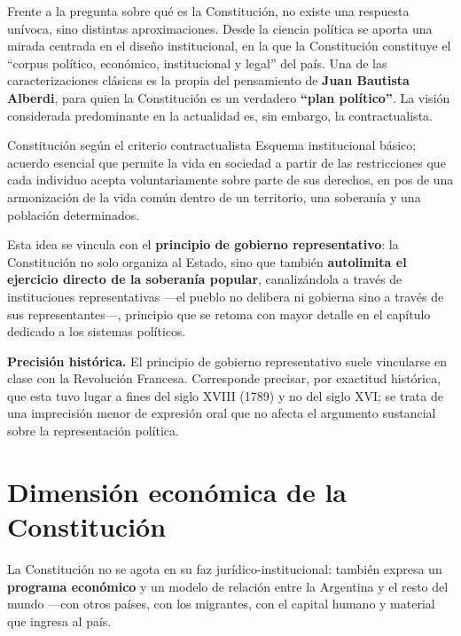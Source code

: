 \documentclass[12pt,oneside]{book}
\begin{document}
Frente a la pregunta sobre qué es la Constitución, no existe una respuesta unívoca, sino distintas aproximaciones. Desde la ciencia política se aporta una mirada centrada en el diseño institucional, en la que la Constitución constituye el ``corpus político, económico, institucional y legal'' del país. Una de las caracterizaciones clásicas es la propia del pensamiento de \textbf{Juan Bautista Alberdi}, para quien la Constitución es un verdadero \textbf{``plan político''}. La visión considerada predominante en la actualidad es, sin embargo, la contractualista.

\begin{definition}{Constitución según el criterio contractualista}
Esquema institucional básico; acuerdo esencial que permite la vida en sociedad a partir de las restricciones que cada individuo acepta voluntariamente sobre parte de sus derechos, en pos de una armonización de la vida común dentro de un territorio, una soberanía y una población determinados.
\end{definition}

Esta idea se vincula con el \textbf{principio de gobierno representativo}: la Constitución no solo organiza al Estado, sino que también \textbf{autolimita el ejercicio directo de la soberanía popular}, canalizándola a través de instituciones representativas ---el pueblo no delibera ni gobierna sino a través de sus representantes---, principio que se retoma con mayor detalle en el capítulo dedicado a los sistemas políticos.

\begin{note}
\textbf{Precisión histórica.} El principio de gobierno representativo suele vincularse en clase con la Revolución Francesa. Corresponde precisar, por exactitud histórica, que esta tuvo lugar a fines del siglo XVIII (1789) y no del siglo XVI; se trata de una imprecisión menor de expresión oral que no afecta el argumento sustancial sobre la representación política.
\end{note}

\section{Dimensión económica de la Constitución}

La Constitución no se agota en su faz jurídico-institucional: también expresa un \textbf{programa económico} y un modelo de relación entre la Argentina y el resto del mundo ---con otros países, con los migrantes, con el capital humano y material que ingresa al país.
\end{document}
